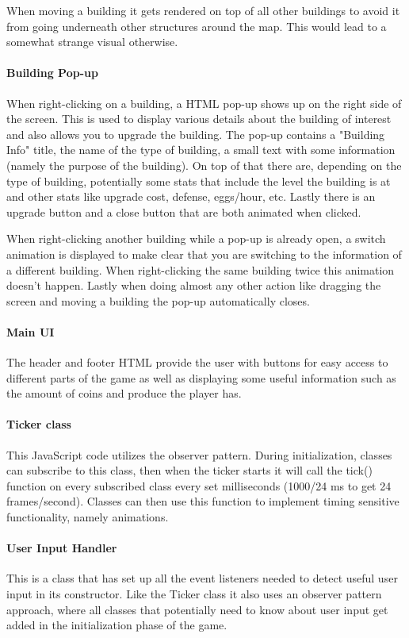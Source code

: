 \documentclass[12pt]{article}
\begin{document}
When moving a building it gets rendered on top of all other buildings to avoid it from going underneath other structures
around the map. This would lead to a somewhat strange visual otherwise.

\paragraph{Building Pop-up} When right-clicking on a building, a HTML pop-up shows up on the right side of the screen.
This is used to display various details about the building of interest and also allows you to upgrade the building. The
pop-up contains a "Building Info" title, the name of the type of building, a small text with some information (namely
the purpose of the building). On top of that there are, depending on the type of building, potentially some stats that
include the level the building is at and other stats like upgrade cost, defense, eggs/hour, etc. Lastly there is an
upgrade button and a close button that are both animated when clicked.

When right-clicking another building while a pop-up is already open, a switch animation is displayed to make clear that
you are switching to the information of a different building. When right-clicking the same building twice this animation
doesn't happen. Lastly when doing almost any other action like dragging the screen and moving a building the pop-up
automatically closes.

\paragraph{Main UI} The header and footer HTML provide the user with buttons for easy access to different parts of the
game as well as displaying some useful information such as the amount of coins and produce the player has.

\paragraph{Ticker class} This JavaScript code utilizes the observer pattern. During initialization, classes can
subscribe to this class, then when the  ticker starts it will call the tick() function on every subscribed class every
set milliseconds (1000/24 ms to get 24 frames/second). Classes can then use this function to implement timing sensitive
functionality, namely animations.

\paragraph{User Input Handler} This is a class that has set up all the event listeners needed to detect useful user
input in its constructor. Like the Ticker class it also uses an observer pattern approach, where all classes that
potentially need to know about user input get added in the initialization phase of the game.
\end{document}
